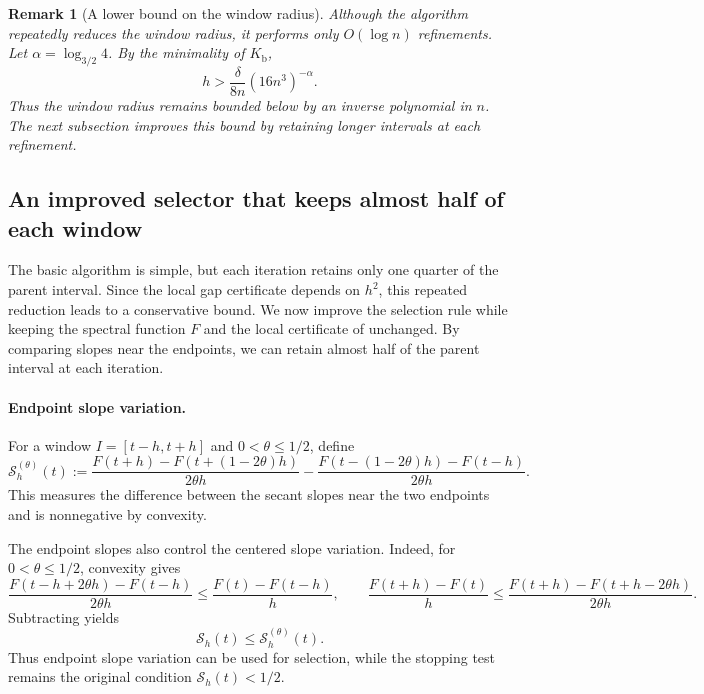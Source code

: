 \documentclass[10pt,a4paper]{article}
\newtheorem{remark}{Remark}[section]
\begin{document}
\begin{remark}[A lower bound on the window radius]
\label{rem:basic-selection-scale}
Although the algorithm repeatedly reduces the window
radius, it performs only $O(\log n)$ refinements.
Let $\alpha=\log_{3/2}4$. By the minimality of
$K_{\mathrm b}$,
\begin{equation}\label{eq:basic-selection-scale}
\boxed{
h>\frac{\delta}{8n}(16n^3)^{-\alpha}.
}
\end{equation}
Thus the window radius remains bounded below by
an inverse polynomial in $n$. The next subsection
improves this bound by retaining longer intervals
at each refinement.
\end{remark}

\subsection{An improved selector that keeps almost half of each window}
\label{subsec:improved-selection}

The basic algorithm is simple, but each iteration retains only one quarter
of the parent interval. Since the local gap certificate depends on $h^2$,
this repeated reduction leads to a conservative bound. We now improve
the selection rule while keeping the spectral function $F$ and the local
certificate of  unchanged. By comparing slopes near the
endpoints, we can retain almost half of the parent interval at each iteration.

\paragraph{Endpoint slope variation.}
For a window $I=[t-h,t+h]$ and $0<\theta\leq1/2$, define
\begin{equation}\label{eq:endpoint-slope}
\boxed{
\mathcal S_h^{(\theta)}(t)
:=
\frac{F(t+h)-F(t+(1-2\theta)h)}{2\theta h}
-
\frac{F(t-(1-2\theta)h)-F(t-h)}{2\theta h}.
}
\end{equation}
This measures the difference between the secant slopes near the two
endpoints and is nonnegative by convexity.


The endpoint slopes also control the centered slope variation. Indeed,
for $0<\theta\leq1/2$, convexity gives
\[
\frac{F(t-h+2\theta h)-F(t-h)}{2\theta h}
\leq\frac{F(t)-F(t-h)}h,
\qquad
\frac{F(t+h)-F(t)}h
\leq\frac{F(t+h)-F(t+h-2\theta h)}{2\theta h}.
\]
Subtracting yields
\begin{equation}\label{eq:potential-controls-S}
\boxed{\mathcal S_h(t)\leq\mathcal S_h^{(\theta)}(t).}
\end{equation}
Thus endpoint slope variation can be used for selection, while the
stopping test remains the original condition $\mathcal S_h(t)<1/2$.
\end{document}
